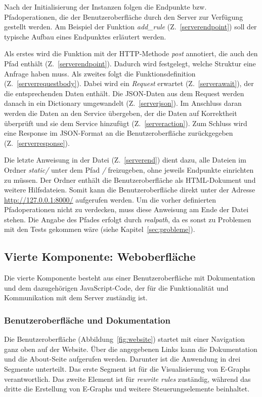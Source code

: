 Nach der Initialisierung der Instanzen folgen die Endpunkte bzw. Pfadoperationen, die der Benutzeroberfläche durch den Server zur Verfügung gestellt werden.
Am Beispiel der Funktion \textit{add\_rule} (Z.~\ref{serverendpoint}) soll der typische Aufbau eines Endpunktes erläutert werden.

Als erstes wird die Funktion mit der HTTP-Methode \textit{post} annotiert, die auch den Pfad enthält (Z.~\ref{serverendpoint}).
Dadurch wird festgelegt, welche Struktur eine Anfrage haben muss.
Als zweites folgt die Funktionsdefinition (Z.~\ref{serverrequestbody}). Dabei wird ein \textit{Request} erwartet (Z.~\ref{serverawait}), der die entsprechenden Daten enthält. 
Die JSON-Daten aus dem Request werden danach in ein Dictionary umgewandelt (Z.~\ref{serverjson}).
Im Anschluss daran werden die Daten an den Service übergeben, der die Daten auf Korrektheit überprüft und sie dem Service hinzufügt (Z.~\ref{serveraction}).
Zum Schluss wird eine Response im JSON-Format an die Benutzeroberfläche zurückgegeben (Z.~\ref{serverresponse}).

Die letzte Anweisung in der Datei (Z.~\ref{serverend}) dient dazu, alle Dateien im Ordner \textit{static/} unter dem Pfad \textit{/} freizugeben, ohne jeweils Endpunkte einrichten zu müssen.
Der Ordner enthält die Benutzeroberfläche als HTML-Dokument und weitere Hilfsdateien. Somit kann die Benutzeroberfläche direkt unter der Adresse \url{http://127.0.0.1:8000/}
aufgerufen werden. Um die vorher definierten Pfadoperationen nicht zu verdecken, muss diese Anweisung am Ende der Datei stehen.
Die Angabe des Pfades erfolgt durch \textit{realpath}, da es sonst zu Problemen mit den Tests gekommen wäre (siehe Kapitel~\ref{sec:probleme}).

\subsection{Vierte Komponente: Weboberfläche}

Die vierte Komponente besteht aus einer Benutzeroberfläche mit Dokumentation und dem dazugehörigen JavaScript-Code, der für die Funktionalität und Kommunikation mit dem Server
zuständig ist.

\subsubsection{Benutzeroberfläche und Dokumentation}

Die Benutzeroberfläche (Abbildung~\ref{fig:website}) startet mit einer Navigation ganz oben auf der Website. Über die angegebenen Links kann die Dokumentation und die About-Seite aufgerufen werden.
Darunter ist die Anwendung in drei Segmente unterteilt. Das erste Segment ist für die Visualisierung von E-Graphs verantwortlich. Das zweite Element ist für \textit{rewrite rules} zuständig, während das dritte 
die Erstellung von E-Graphs und weitere Steuerungselemente beinhaltet.

